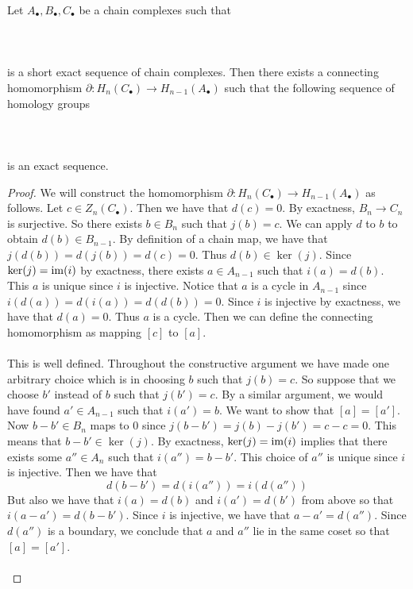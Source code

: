 \documentclass[a4paper]{article}
\begin{document}
\begin{thm}{}{} Let $A_\bullet,B_\bullet,C_\bullet$ be a chain complexes such that \\~\\
\\~\\
is a short exact sequence of chain complexes. Then there exists a connecting homomorphism $\partial:H_n(C_\bullet)\to H_{n-1}(A_\bullet)$ such that the following sequence of homology groups \\~\\
\\~\\
is an exact sequence. \tcbline
\begin{proof}
We will construct the homomorphism $\partial:H_n(C_\bullet)\to H_{n-1}(A_\bullet)$ as follows. Let $c\in Z_n(C_\bullet)$. Then we have that $d(c)=0$. By exactness, $B_n\to C_n$ is surjective. So there exists $b\in B_n$ such that $j(b)=c$. We can apply $d$ to $b$ to obtain $d(b)\in B_{n-1}$. By definition of a chain map, we have that $j(d(b))=d(j(b))=d(c)=0$. Thus $d(b)\in\ker(j)$. Since $\ker(j)=\operatorname{im}(i)$ by exactness, there exists $a\in A_{n-1}$ such that $i(a)=d(b)$. This $a$ is unique since $i$ is injective. Notice that $a$ is a cycle in $A_{n-1}$ since $i(d(a))=d(i(a))=d(d(b))=0$. Since $i$ is injective by exactness, we have that $d(a)=0$. Thus $a$ is a cycle. Then we can define the connecting homomorphism as mapping $[c]$ to $[a]$. \\~\\

This is well defined. Throughout the constructive argument we have made one arbitrary choice which is in choosing $b$ such that $j(b)=c$. So suppose that we choose $b'$ instead of $b$ such that $j(b')=c$. By a similar argument, we would have found $a'\in A_{n-1}$ such that $i(a')=b$. We want to show that $[a]=[a']$. Now $b-b'\in B_n$ maps to $0$ since $j(b-b')=j(b)-j(b')=c-c=0$. This means that $b-b'\in\ker(j)$. By exactness, $\ker(j)=\operatorname{im}(i)$ implies that there exists some $a''\in A_n$ such that $i(a'')=b-b'$. This choice of $a''$ is unique since $i$ is injective. Then we have that $$d(b-b')=d(i(a''))=i(d(a''))$$ But also we have that $i(a)=d(b)$ and $i(a')=d(b')$ from above so that $i(a-a')=d(b-b')$. Since $i$ is injective, we have that $a-a'=d(a'')$. Since $d(a'')$ is a boundary, we conclude that $a$ and $a''$ lie in the same coset so that $[a]=[a']$. \\~\\


\end{proof}
\end{thm}
\end{document}
